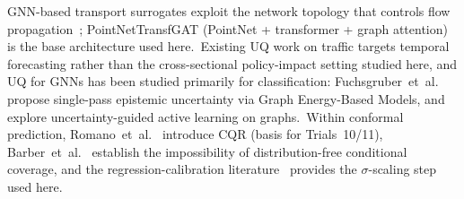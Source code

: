 GNN-based transport surrogates exploit the network topology that controls flow propagation~\cite{natterer2025ml}; PointNetTransfGAT (PointNet + transformer + graph attention)~\cite{natterer2025ml} is the base architecture used here.\ Existing UQ work on traffic targets temporal forecasting rather than the cross-sectional policy-impact setting studied here, and UQ for GNNs has been studied primarily for classification: Fuchsgruber~et~al.~\cite{fuchsgruber2024energy} propose single-pass epistemic uncertainty via Graph Energy-Based Models, and~\cite{fuchsgruber2024uncertainty} explore uncertainty-guided active learning on graphs.\ Within conformal prediction, Romano~et~al.~\cite{romano2019conformalized} introduce CQR (basis for Trials~10/11), Barber~et~al.~\cite{barber2021limits} establish the impossibility of distribution-free conditional coverage, and the regression-calibration literature~\cite{kuleshov2018accurate,laves2020wellcal,guo2017calibration} provides the $\sigma$-scaling step used here.
